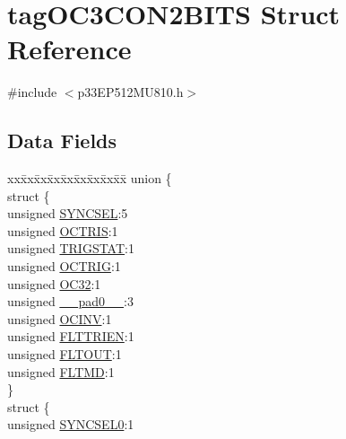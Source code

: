\hypertarget{structtag_o_c3_c_o_n2_b_i_t_s}{}\section{tag\+O\+C3\+C\+O\+N2\+B\+I\+TS Struct Reference}
\label{structtag_o_c3_c_o_n2_b_i_t_s}


{\ttfamily \#include $<$p33\+E\+P512\+M\+U810.\+h$>$}

\subsection*{Data Fields}
\begin{DoxyCompactItemize}
\item 
\begin{tabbing}
xx\=xx\=xx\=xx\=xx\=xx\=xx\=xx\=xx\=\kill
union \{\\
\>struct \{\\
\>\>unsigned \hyperlink{structtag_o_c3_c_o_n2_b_i_t_s_a35fbbe11485c2615ed27535b62c3fa35}{SYNCSEL}:5\\
\>\>unsigned \hyperlink{structtag_o_c3_c_o_n2_b_i_t_s_ab849a74c6179282ed6b06cc047c80544}{OCTRIS}:1\\
\>\>unsigned \hyperlink{structtag_o_c3_c_o_n2_b_i_t_s_ab379549de54ac93ad4aa73686c34cb7c}{TRIGSTAT}:1\\
\>\>unsigned \hyperlink{structtag_o_c3_c_o_n2_b_i_t_s_a8d2cf9b996ef2b9079defa8950de798c}{OCTRIG}:1\\
\>\>unsigned \hyperlink{structtag_o_c3_c_o_n2_b_i_t_s_af52e127483a703e0fa84c7d4f1de0df4}{OC32}:1\\
\>\>unsigned \hyperlink{structtag_o_c3_c_o_n2_b_i_t_s_adf71f3d8410c1f1dbbc96680a92c49af}{\_\_pad0\_\_}:3\\
\>\>unsigned \hyperlink{structtag_o_c3_c_o_n2_b_i_t_s_a301004fca40c8d19d418866c92c19a06}{OCINV}:1\\
\>\>unsigned \hyperlink{structtag_o_c3_c_o_n2_b_i_t_s_ab979b75e02643aa840fb6ee50e0c30fa}{FLTTRIEN}:1\\
\>\>unsigned \hyperlink{structtag_o_c3_c_o_n2_b_i_t_s_ae466664b094d9c830e9ce20b86d7907f}{FLTOUT}:1\\
\>\>unsigned \hyperlink{structtag_o_c3_c_o_n2_b_i_t_s_a245ca3019d6c6ccbfb09f1c821146bb5}{FLTMD}:1\\
\>\} \\
\>struct \{\\
\>\>unsigned \hyperlink{structtag_o_c3_c_o_n2_b_i_t_s_a3b5df3154fde5141e6ac0156425ff8b4}{SYNCSEL0}:1\\

\end{tabbing}
\end{DoxyCompactItemize}
